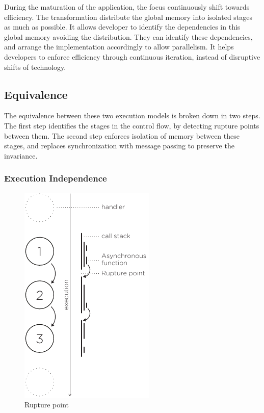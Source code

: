 During the maturation of the application, the focus continuously shift towards efficiency.
The transformation distribute the global memory into isolated stages as much as possible.
It allows developer to identify the dependencies in this global memory avoiding the distribution.
They can identify these dependencies, and arrange the implementation accordingly to allow parallelism.
It helps developers to enforce efficiency through continuous iteration, instead of disruptive shifts of technology.




\subsection{Equivalence} \label{chapter4:equivalence}

The equivalence between these two execution models is broken down in two steps. %
The first step identifies the stages in the control flow, by detecting rupture points between them.
The second step enforces isolation of memory between these stages, and replaces synchronization with message passing to preserve the invariance.

\subsubsection{Execution Independence}

\begin{figure}
  \vspace{-10pt}
  \begin{center}
    \includegraphics[height=0.4\textwidth]{../resources/rupture-point.pdf}
    \caption{Rupture point}
    \label{fig:rupture-point}
  \end{center}
  \vspace{-10pt}
\end{figure}

